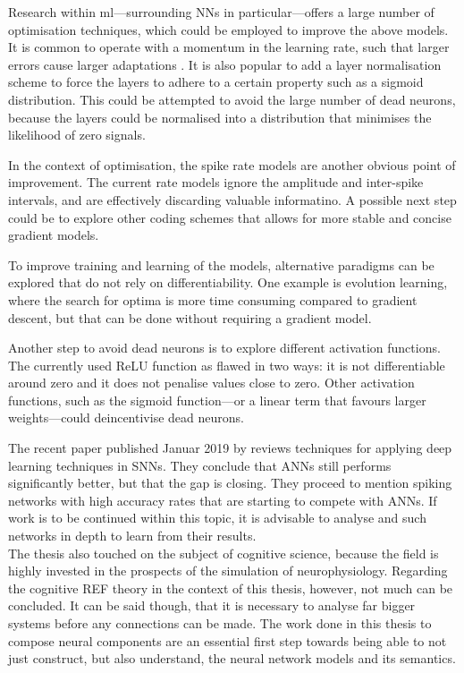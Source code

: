 \documentclass[report.tex]{subfiles}
\begin{document}
Research within \gls{ml}---surrounding \glspl{NN} in particular---offers a large
number of optimisation techniques, which could be employed to improve the above
models.
It is common to operate with a momentum in the learning rate, such that
larger errors cause larger adaptations \cite{Montavon1998, Sutskever2013}.
It is also popular to add a layer normalisation scheme to force the layers to
adhere to a certain property such as a sigmoid distribution.
This could be attempted to avoid the large number of dead neurons, because the
layers could be normalised into a distribution that minimises the likelihood of
zero signals.

In the context of optimisation, the spike rate models are another obvious point
of improvement.
The current rate models ignore the amplitude and inter-spike intervals, and are
effectively discarding valuable informatino.
A possible next step could be to explore other coding schemes that
allows for more stable and concise gradient models.

To improve training and learning of the models, alternative paradigms can be explored that do not
rely on differentiability. 
One example is evolution learning, where the search for optima is more time 
consuming compared to gradient descent, but that can be done without requiring a gradient model.

Another step to avoid dead neurons is to explore different activation functions. 
The currently used ReLU function as flawed in two ways: it is not
differentiable around zero and it does not penalise values close to
zero.
Other activation functions, such as the sigmoid function---or a linear term
that favours larger weights---could deincentivise dead neurons.

The recent paper published Januar 2019 by \citeauthor{Tavanaei2019} reviews
techniques for applying deep learning techniques in \glspl{SNN}.
They conclude that \glspl{ANN} still performs significantly better, but that the
gap is closing.
They proceed to mention spiking networks with high accuracy rates that are starting to
compete with \glspl{ANN}. 
If work is to be continued within this topic, it is advisable to analyse and
such networks in depth to learn from their results.
\\[0.1cm]

The thesis also touched on the subject of cognitive science, because the field
is highly invested in the prospects of the simulation of neurophysiology.
Regarding the cognitive REF theory in the context of this thesis, however, not much can be concluded.
It can be said though, that it is necessary to analyse far bigger systems before
any connections can be made.
The work done in this thesis to compose neural components are an essential first
step towards being able to not just construct, but also understand, the neural
network models and its semantics.
\\[0.1cm]
\end{document}
